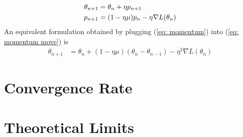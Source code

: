 \begin{definition}
	\begin{subequations}
	\begin{align}
		\theta_{n+1} &= \theta_n + \eta p_{n+1} \label{eq: momentum move}\\
		p_{n+1} &= (1-\eta\mu)p_n - \eta\nabla L(\theta_n)
		\label{eq: momentum}
	\end{align}
	\end{subequations}
	An equivalent formulation obtained by plugging (\ref{eq: momentum}) into
	(\ref{eq: momentum move}) is
	\begin{align}
		\theta_{n+1}
		&= \theta_n + (1-\eta\mu)(\theta_n - \theta_{n-1}) - \eta^2\nabla L(\theta_n)
	\end{align}
\end{definition}



\section{Convergence Rate}

\section{Theoretical Limits}


\endinput
